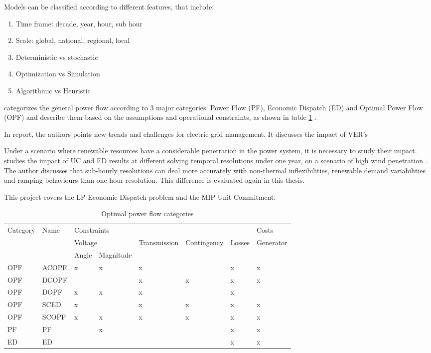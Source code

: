 \documentclass[12pt,LUDisStyle,twosided]{book}
\begin{document}
Models can be classified according to different features, that include:

\begin{enumerate}
\item Time frame: decade, year, hour, sub hour 
\item Scale: global, national, regional, local
\item Deterministic vs stochastic
\item Optimization vs Simulation
\item Algorithmic vs Heuristic
\end{enumerate}

\citeauthor{cain} categorizes the general power flow according to 3 major categories: Power Flow (PF), Economic Dispatch (ED) and Optimal Power Flow (OPF) and describe them based on the assumptions and operational constraints, as shown in table \ref{table:PowerSystemsCat} \cite{cain}.

In \citeauthor{kassakian} report, the authors points new trends and challenges for electric grid management. It discusses the impact of VER's


Under a scenario where renewable resources have a considerable penetration in the power system, it is necessary to study their impact. \citeauthor{deane} studies the impact of UC and ED results at different solving temporal resolutions under one year, on a scenario of high wind penetration \cite{deane}. The author discusses that sub-hourly resolutions can deal more accurately with non-thermal inflexibilities, renewable demand variabilities and ramping behaviours than one-hour resolution. This difference is evaluated again in this thesis.

This project covers the LP Economic Dispatch problem and the MIP Unit Commitment.

\begin{table}[h]
\centering
\caption{Optimal power flow categories \cite{cain}}
\label{table:PowerSystemsCat}
\begin{tabular}{|l|l|l|l|l|l|l|l|}
\hline
\multirow{3}{*}{Category} & \multirow{3}{*}{Name} & \multicolumn{5}{l|}{Constraints} & Costs \\ \cline{3-8} 
 &  & \multicolumn{2}{l|}{Voltage} & \multirow{2}{*}{Transmission} & \multirow{2}{*}{Contingency} & \multirow{2}{*}{Losses} & \multirow{2}{*}{Generator} \\ \cline{3-4}
 &  & Angle & Magnitude &  &  &  &  \\ \hline
OPF & ACOPF & x & x & x &  & x & x \\ \hline
OPF & DCOPF &  &  & x & x & x & x \\ \hline
OPF & DOPF & x & x & x &  & x &  \\ \hline
OPF & SCED & x &  & x & x & x & x \\ \hline
OPF & SCOPF & x & x & x & x & x & x \\ \hline
PF & PF &  & x &  &  & x & x \\ \hline
ED & ED &  &  &  &  & x & x \\ \hline
\end{tabular}
\end{table}
\end{document}
